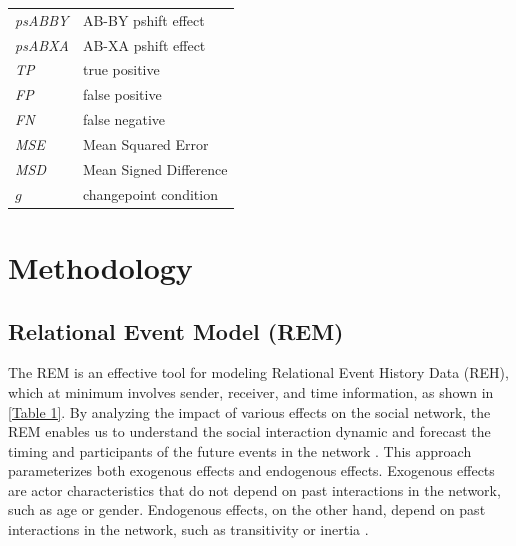 \documentclass[]{interact}
\theoremstyle{plain}%
\theoremstyle{definition}
\theoremstyle{remark}
\begin{document}
\begin{table}[H]
\begin{tabular}{ll}
    		\textit{psABBY}                                                                                 & AB-BY pshift effect                                           \\
    		\textit{psABXA}                                                                                 & AB-XA pshift effect                                           \\
    		\textit{TP}                                                                                     & true positive                                                 \\
    		\textit{FP}                                                                                     & false positive                                                \\
    		\textit{FN}                                                                                     & false negative                                                \\
    		\textit{MSE}                                                                                    & Mean Squared Error                                            \\
    		\textit{MSD}                                                                                    & Mean Signed Difference                                        \\
    		\textit{$g$}                                                                                    & changepoint condition                                         \\ \hline
    	\end{tabular}
      \label{abbrev}
    \end{table}
	
	\section{\fontsize{14}{15}\selectfont Methodology} \label{sec:method}
	
	\subsection{Relational Event Model (REM)} \label{sec:REM}
	
	\hspace{0.28cm} The REM is an effective tool for modeling Relational Event History Data (REH), which at minimum involves sender, receiver, and time information, as shown in \autoref{Table 1}. By analyzing the impact of various effects on the social network, the REM enables us to understand the social interaction dynamic and forecast the timing and participants of the future events in the network \cite{buttsRelationalEventFramework2008}. This approach parameterizes both exogenous effects and endogenous effects. Exogenous effects are actor characteristics that do not depend on past interactions in the network, such as age or gender. Endogenous effects, on the other hand, depend on past interactions in the network, such as transitivity or inertia \cite{meijerink-bosmanDiscoveringTrendsSocial2022}. \\
	
\end{document}
